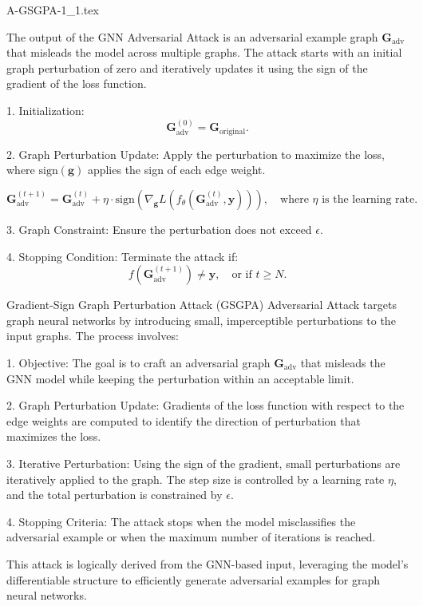 A-GSGPA-1_1.tex%


The output of the GNN Adversarial Attack is an adversarial example graph $\mathbf{G}_{\text{adv}}$ that misleads the model across multiple graphs. The attack starts with an initial graph perturbation of zero and iteratively updates it using the sign of the gradient of the loss function.

1. Initialization:
   \[
   \mathbf{G}_{\text{adv}}^{(0)} = \mathbf{G}_{\text{original}}.
   \]

2. Graph Perturbation Update:
   Apply the perturbation to maximize the loss, where $\text{sign}(\mathbf{g})$ applies the sign of each edge weight.

   \[
   \mathbf{G}_{\text{adv}}^{(t+1)} = \mathbf{G}_{\text{adv}}^{(t)} + \eta \cdot \text{sign}(\nabla_\mathbf{g} L(f_\theta(\mathbf{G}_{\text{adv}}^{(t)}, \mathbf{y}))), \quad \text{where } \eta \text{ is the learning rate.}
   \]

3. Graph Constraint:
   Ensure the perturbation does not exceed $\epsilon$.

4. Stopping Condition:
   Terminate the attack if:
   \[
   f(\mathbf{G}_{\text{adv}}^{(t+1)}) \neq \mathbf{y}, \quad \text{or if } t \geq N.
   \]

Gradient-Sign Graph Perturbation Attack (GSGPA) Adversarial Attack targets graph neural networks by introducing small, imperceptible perturbations to the input graphs. The process involves:

1. Objective: The goal is to craft an adversarial graph $\mathbf{G}_{\text{adv}}$ that misleads the GNN model while keeping the perturbation within an acceptable limit.

2. Graph Perturbation Update: Gradients of the loss function with respect to the edge weights are computed to identify the direction of perturbation that maximizes the loss.

3. Iterative Perturbation: Using the sign of the gradient, small perturbations are iteratively applied to the graph. The step size is controlled by a learning rate $\eta$, and the total perturbation is constrained by $\epsilon$.

4. Stopping Criteria: The attack stops when the model misclassifies the adversarial example or when the maximum number of iterations is reached.

This attack is logically derived from the GNN-based input, leveraging the model's differentiable structure to efficiently generate adversarial examples for graph neural networks.